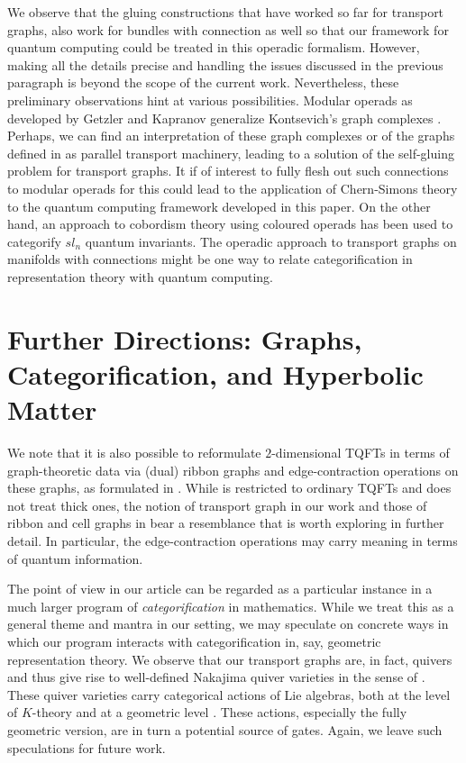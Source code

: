 \documentclass{amsart}
\numberwithin{thm}{section}
\theoremstyle{definition}
\begin{document}
We observe that the gluing constructions that have worked so far for transport
graphs, also work for bundles with connection as well so that our framework for
quantum computing could be treated in this operadic formalism. However, making
all the details precise and handling the issues discussed in the previous
paragraph is beyond the scope of the current work. Nevertheless,
these preliminary observations hint at various possibilities.
Modular operads as developed by Getzler and Kapranov generalize
Kontsevich's graph complexes \cite{ModOp}. Perhaps, we can find an
interpretation of these graph complexes or of the graphs defined in
\cite{ModOp} as parallel transport machinery, leading
to a solution of the self-gluing problem for transport graphs.
It if of interest to fully flesh out such connections to
modular operads for this could lead to the
application of Chern-Simons theory to the quantum computing framework
developed in this paper. On the other hand, an approach to cobordism
theory using coloured operads \cite{CobOp} has been used to categorify $sl_n$
quantum invariants. The operadic approach to transport graphs on manifolds
with connections might be one way to relate categorification in
representation theory with quantum computing.

\section{Further Directions: Graphs, Categorification, and Hyperbolic Matter}

We note that it is also possible to reformulate $2$-dimensional TQFTs in terms of graph-theoretic data via (dual) ribbon graphs and edge-contraction operations on these graphs, as formulated in \cite{DM}.  While \cite{DM} is restricted to ordinary TQFTs and does not treat thick ones, the notion of transport graph in our work and those of ribbon and cell graphs in \cite{DM} bear a resemblance that is worth exploring in further detail.  In particular, the edge-contraction operations may carry meaning in terms of quantum information.

The point of view in our article can be regarded as a particular instance in a much larger program of \emph{categorification} in mathematics.  While we treat this as a general theme and mantra in our setting, we may speculate on concrete ways in which our program interacts with categorification in, say, geometric representation theory.  We observe that our transport graphs are, in fact, quivers and thus give rise to well-defined Nakajima quiver varieties in the sense of \cite{HN1}.  These quiver varieties carry categorical actions of Lie algebras, both at the level of $K$-theory \cite{HN2} and at a geometric level \cite{CKL}.  These actions, especially the fully geometric version, are in turn a potential source of gates.  Again, we leave such speculations for future work.
\end{document}
